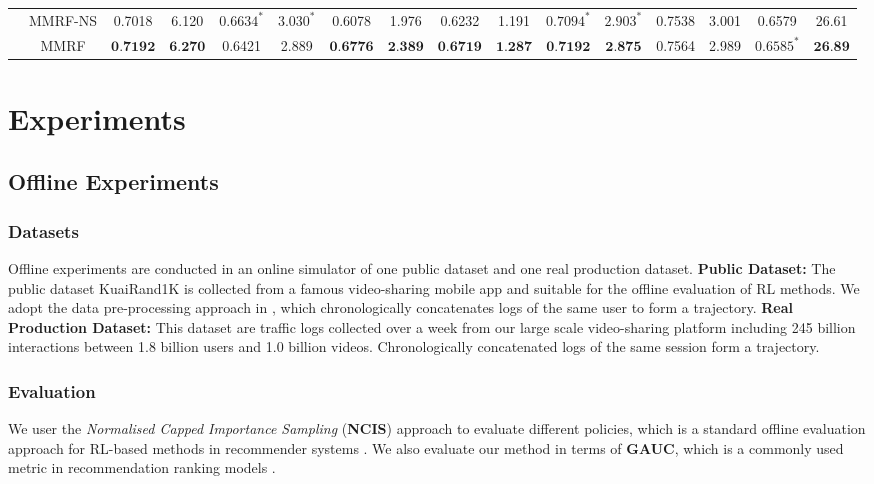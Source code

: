 \begin{table*}[tp]
\begin{tabular}{cc||cc||cc||cc||cc||cc||cc||cc}
 \\
    & MMRF-NS & 0.7018 & 6.120 & $0.6634^*$ & $3.030^*$ & 0.6078 & 1.976 & 0.6232 & 1.191 & $0.7094^*$ & $2.903^*$ & 0.7538 & 3.001 & 0.6579 & 26.61
 \\
    & MMRF & $\textbf{0.7192}$ & $\textbf{6.270}$ & 0.6421 & 2.889 & $\textbf{0.6776}$ & $\textbf{2.389}$ & $\textbf{0.6719}$ & $\textbf{1.287}$ & $\textbf{0.7192}$ & $\textbf{2.875}$ & 0.7564 & 2.989 & $0.6585^*$ & $\textbf{26.89}$
 \\
    \bottomrule
  \end{tabular}
\vspace{-1em}
\end{table*}



\section{Experiments}
\subsection{Offline Experiments}
\subsubsection{Datasets} 
Offline experiments are conducted in an online simulator of one public dataset and one real production dataset.
\textbf{Public Dataset: }
The public dataset KuaiRand1K \cite{gao2022kuairand} is collected from a famous video-sharing mobile app and suitable for the offline evaluation of RL methods. We adopt the data pre-processing approach in \cite{cai2023two}, which chronologically concatenates logs of the same user to form a trajectory. 
\textbf{Real Production Dataset: }
This dataset are traffic logs collected over a week from our large scale video-sharing platform including 245 billion interactions between 1.8 billion users and 1.0 billion videos. Chronologically concatenated logs of the same session form a trajectory.


\subsubsection{Evaluation} 
We user the \textit{Normalised Capped Importance Sampling} (\textbf{NCIS}) approach to evaluate different policies, which is a standard offline evaluation approach for RL-based methods in recommender systems \cite{zou2019reinforcement}. We also evaluate our method in terms of \textbf{GAUC}, which is a commonly used metric in recommendation ranking models \cite{zhou2018deep}.

